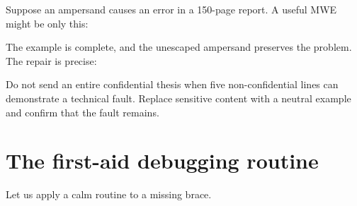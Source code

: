 Suppose an ampersand causes an error in a 150-page report. A useful MWE might
be only this:


The example is complete, and the unescaped ampersand preserves the problem.
The repair is precise:


Do not send an entire confidential thesis when five non-confidential lines can
demonstrate a technical fault. Replace sensitive content with a neutral example
and confirm that the fault remains.

\section{The first-aid debugging routine}

Let us apply a calm routine to a missing brace.

